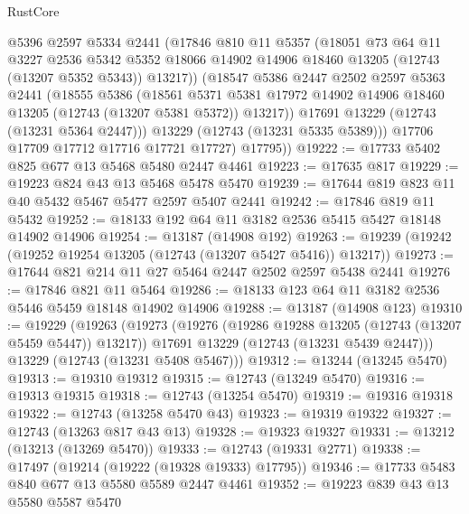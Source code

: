 \begin{lexlean}{RustCore}
\begin{coremodule}
            @5396
            @2597
            @5334
            @2441
            (@17846
              @810
              @11
              @5357
              (@18051
                @73
                @64
                @11
                @3227
                @2536
                @5342
                @5352
                @18066
                @14902
                @14906
                @18460
                @13205
                (@12743 (@13207 @5352 @5343))
                @13217))
            (@18547
              @5386
              @2447
              @2502
              @2597
              @5363
              @2441
              (@18555
                @5386
                (@18561
                  @5371
                  @5381
                  @17972
                  @14902
                  @14906
                  @18460
                  @13205
                  (@12743 (@13207 @5381 @5372))
                  @13217))
              @17691
              @13229
              (@12743 (@13231 @5364 @2447)))
            @13229
            (@12743 (@13231 @5335 @5389)))
          @17706
          @17709
          @17712
          @17716
          @17721
          @17727)
        @17795))
@19222 := @17733 @5402 @825 @677 @13 @5468 @5480 @2447 @4461
@19223 := @17635 @817
@19229 := @19223 @824 @43 @13 @5468 @5478 @5470
@19239 := @17644 @819 @823 @11 @40 @5432 @5467 @5477 @2597 @5407 @2441
@19242 := @17846 @819 @11 @5432
@19252 := @18133 @192 @64 @11 @3182 @2536 @5415 @5427 @18148 @14902 @14906
@19254 := @13187 (@14908 @192)
@19263 := @19239 (@19242 (@19252 @19254 @13205 (@12743 (@13207 @5427 @5416)) @13217))
@19273 := @17644 @821 @214 @11 @27 @5464 @2447 @2502 @2597 @5438 @2441
@19276 := @17846 @821 @11 @5464
@19286 := @18133 @123 @64 @11 @3182 @2536 @5446 @5459 @18148 @14902 @14906
@19288 := @13187 (@14908 @123)
@19310 := @19229
    (@19263
      (@19273
        (@19276 (@19286 @19288 @13205 (@12743 (@13207 @5459 @5447)) @13217))
        @17691
        @13229
        (@12743 (@13231 @5439 @2447)))
      @13229
      (@12743 (@13231 @5408 @5467)))
@19312 := @13244 (@13245 @5470)
@19313 := @19310 @19312
@19315 := @12743 (@13249 @5470)
@19316 := @19313 @19315
@19318 := @12743 (@13254 @5470)
@19319 := @19316 @19318
@19322 := @12743 (@13258 @5470 @43)
@19323 := @19319 @19322
@19327 := @12743 (@13263 @817 @43 @13)
@19328 := @19323 @19327
@19331 := @13212 (@13213 (@13269 @5470))
@19333 := @12743 (@19331 @2771)
@19338 := @17497 (@19214 (@19222 (@19328 @19333) @17795))
@19346 := @17733 @5483 @840 @677 @13 @5580 @5589 @2447 @4461
@19352 := @19223 @839 @43 @13 @5580 @5587 @5470

\end{coremodule}
\end{lexlean}
